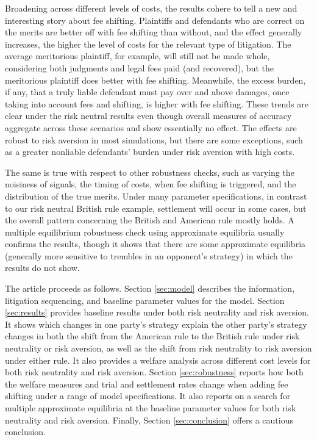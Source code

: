 \documentclass{article}
\begin{document}
Broadening across different levels of costs, the results cohere to tell a new and interesting story about fee shifting. Plaintiffs and defendants who are correct on the merits are better off with fee shifting than without, and the effect generally increases, the higher the level of costs for the relevant type of litigation. The average meritorious plaintiff, for example, will still not be made whole, considering both judgments and legal fees paid (and recovered), but the meritorious plaintiff does better with fee shifting. Meanwhile, the excess burden, if any, that a truly liable defendant must pay over and above damages, once taking into account fees and shifting, is higher with fee shifting. These trends are clear under the risk neutral results even though overall measures of accuracy aggregate across these scenarios and show essentially no effect. The effects are robust to risk aversion in most simulations, but there are some exceptions, such as a greater nonliable defendants' burden under risk aversion with high costs. 

The same is true with respect to other robustness checks, such as varying the noisiness of signals, the timing of costs, when fee shifting is triggered, and the distribution of the true merits. Under many parameter specifications, in contrast to our risk neutral British rule example, settlement will occur in some cases, but the overall pattern concerning the British and American rule mostly holds. A multiple equilibrium robustness check using approximate equilibria usually confirms the results, though it shows that there are some approximate equilibria (generally more sensitive to trembles in an opponent's strategy) in which the results do not show. 

The article proceeds as follows. Section \ref{sec:model} describes the information, litigation sequencing, and baseline parameter values for the model. Section \ref{sec:results} provides baseline results under both risk neutrality and risk aversion. It shows which changes in one party's strategy explain the other party's strategy changes in both the shift from the American rule to the British rule under risk neutrality or risk aversion, as well as the shift from risk neutrality to risk aversion under either rule. It also provides a welfare analysis across different cost levels for both risk neutrality and risk aversion. Section \ref{sec:robustness} reports how both the welfare measures and trial and settlement rates change when adding fee shifting under a range of model specifications. It also reports on a search for multiple approximate equilibria at the baseline parameter values for both risk neutrality and risk aversion. Finally, Section \ref{sec:conclusion} offers a cautious conclusion. 
\end{document}
